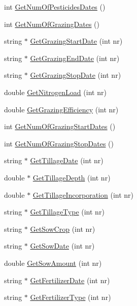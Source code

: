 \begin{DoxyCompactItemize}
\item 
int \hyperlink{classfield_order_ad60b7d9ea87785aa0d8a7bfd7d90875d}{GetNumOfPesticidesDates} ()
\item 
int \hyperlink{classfield_order_af4df87590f97d6ec2c15fac04a10e3ca}{GetNumOfGrazingDates} ()
\item 
string $\ast$ \hyperlink{classfield_order_addaed59d72b2cad5746dacd2cf6165cd}{GetGrazingStartDate} (int nr)
\item 
string $\ast$ \hyperlink{classfield_order_ac63c02e15e64c68173b72b1799f3b3e4}{GetGrazingEndDate} (int nr)
\item 
string $\ast$ \hyperlink{classfield_order_a18afb930b93e677cb62798af5f316406}{GetGrazingStopDate} (int nr)
\item 
double \hyperlink{classfield_order_ac9c93c679ebbcbc2d055e7c7c257f22c}{GetNitrogenLoad} (int nr)
\item 
double \hyperlink{classfield_order_a3f19b5d953d578b23f70b0f8103f0c21}{GetGrazingEfficiency} (int nr)
\item 
int \hyperlink{classfield_order_a07c2791a1a0280f5547e764245618be0}{GetNumOfGrazingStartDates} ()
\item 
int \hyperlink{classfield_order_ac437348851584a8881347045df71d611}{GetNumOfGrazingStopDates} ()
\item 
string $\ast$ \hyperlink{classfield_order_a904e2f0258d49395abf9414ff0c7fb45}{GetTillageDate} (int nr)
\item 
double $\ast$ \hyperlink{classfield_order_a86eebd4c3791fc3f7d443e030e084e49}{GetTillageDepth} (int nr)
\item 
double $\ast$ \hyperlink{classfield_order_aff63770333095cbba8057e1ae80411d4}{GetTillageIncorporation} (int nr)
\item 
string $\ast$ \hyperlink{classfield_order_a97dda61ce3d6ef200a2e69aaea3bce55}{GetTillageType} (int nr)
\item 
string $\ast$ \hyperlink{classfield_order_a0a97fbc6d5e790522c25e92cc5640dea}{GetSowCrop} (int nr)
\item 
string $\ast$ \hyperlink{classfield_order_af2e3a63186e221f461ba00276de62c7b}{GetSowDate} (int nr)
\item 
double \hyperlink{classfield_order_ae39242e1dbdd59553c28e900932f2954}{GetSowAmount} (int nr)
\item 
string $\ast$ \hyperlink{classfield_order_ab1578f58b89ece31a4bb1d2d12ae4002}{GetFertilizerDate} (int nr)
\item 
string $\ast$ \hyperlink{classfield_order_accf9b529e001f0bab2766adcbf9a03e6}{GetFertilizerType} (int nr)

\end{DoxyCompactItemize}
